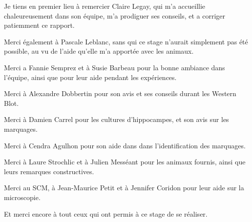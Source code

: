 Je tiens en premier lieu à remercier Claire Legay, qui m'a accueillie chaleureusement dans son équipe, m'a prodiguer ses conseils, et a corriger patiemment ce rapport.

{\setlength{\parindent}{0cm}
Merci également à Pascale Leblanc, sans qui ce stage n'aurait simplement pas été possible, au vu de l'aide qu'elle m'a apportée avec les animaux.

Merci a Fannie Semprez et à Susie Barbeau pour la bonne ambiance dans l'équipe, ainsi que pour leur aide pendant les expériences.

Merci à Alexandre Dobbertin pour son avis et ses conseils durant les Western Blot.

Merci à Damien Carrel pour les cultures d'hippocampes, et son avis sur les marquages.

Merci à Cendra Agulhon pour son aide dans dans l'identification des marquages.

Merci à Laure Strochlic et à Julien Messéant pour les animaux fournis, ainsi que leurs remarques constructives.

Merci au SCM, à Jean-Maurice Petit et à Jennifer Coridon pour leur aide sur la microscopie.

Et merci encore à tout ceux qui ont permis à ce stage de se réaliser.}